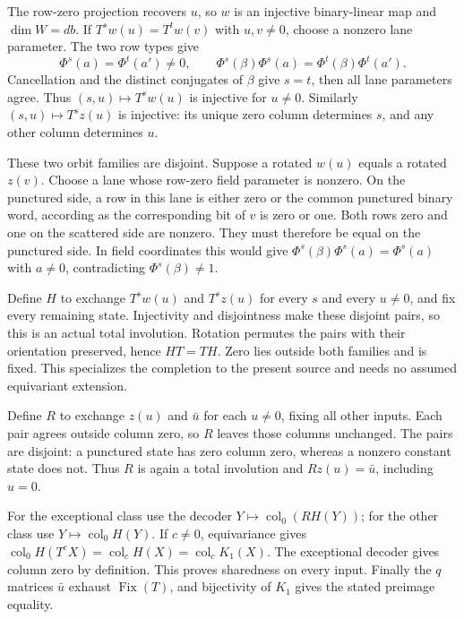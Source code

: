 \begin{outline}
The row-zero projection recovers $u$, so $w$ is an injective binary-linear
map and $\dim W=db$.  If
$T^sw(u)=T^tw(v)$ with $u,v\ne0$, choose a nonzero lane parameter.
The two row types give
\[
 \Phi^s(a)=\Phi^t(a')\ne0,\qquad
 \Phi^s(\beta)\Phi^s(a)=\Phi^t(\beta)\Phi^t(a').
\]
Cancellation and the distinct conjugates of $\beta$ give $s=t$, then
all lane parameters agree.  Thus $(s,u)\mapsto T^sw(u)$ is injective
for $u\ne0$.  Similarly $(s,u)\mapsto T^sz(u)$ is injective: its
unique zero column determines $s$, and any other column determines $u$.

These two orbit families are disjoint.  Suppose a rotated $w(u)$ equals
a rotated $z(v)$.  Choose a lane whose row-zero field parameter is
nonzero.  On the punctured side, a row in this lane is either zero or
the common punctured binary word, according as the corresponding bit of
$v$ is zero or one.  Both rows zero and one on the scattered side are
nonzero.  They must therefore be equal on the punctured side.  In field
coordinates this would give
$\Phi^s(\beta)\Phi^s(a)=\Phi^s(a)$ with $a\ne0$, contradicting
$\Phi^s(\beta)\ne1$.

Define $H$ to exchange $T^sw(u)$ and $T^sz(u)$ for every $s$ and
every $u\ne0$, and fix every remaining state.  Injectivity and
disjointness make these disjoint pairs, so this is an actual total
involution.  Rotation permutes the pairs with their orientation
preserved, hence $HT=TH$.  Zero lies outside both families and is fixed.
This specializes the completion to the present source and needs no
assumed equivariant extension.

Define $R$ to exchange $z(u)$ and $\bar u$ for each $u\ne0$, fixing
all other inputs.  Each pair agrees outside column zero, so $R$ leaves
those columns unchanged.  The pairs are disjoint: a punctured state has
zero column zero, whereas a nonzero constant state does not.  Thus $R$
is again a total involution and $Rz(u)=\bar u$, including $u=0$.

For the exceptional class use the decoder
$Y\mapsto\operatorname{col}_0(RH(Y))$; for the other class use
$Y\mapsto\operatorname{col}_0H(Y)$.
If $c\ne0$, equivariance gives
$\operatorname{col}_0H(T^cX)=\operatorname{col}_cH(X)
 =\operatorname{col}_cK_1(X)$.
The exceptional decoder gives column zero by definition.  This proves
sharedness on every input.  Finally the $q$ matrices $\bar u$ exhaust
$\operatorname{Fix}(T)$, and bijectivity of $K_1$ gives the stated
preimage equality.
\end{outline}

